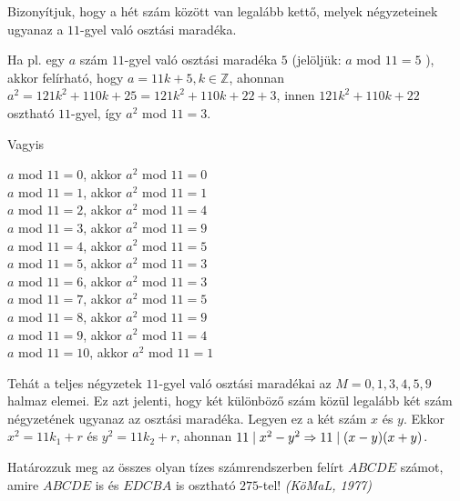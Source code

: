 \begin{solution}
	Bizonyítjuk, hogy a hét szám között van legalább kettő, melyek négyzeteinek
	ugyanaz a $11$-gyel való osztási maradéka.
	
	Ha pl. egy $a$ szám $11$-gyel való osztási maradéka $5$ (jelöljük:
	$a$ mod $11=5$ ), akkor felírható, hogy $a=11k+5,k\in\mathbb{Z}$,
	ahonnan $a^{2}=121k^{2}+110k+25=121k^{2}+110k+22+3$, innen $121k^{2}+110k+22$
	osztható $11$-gyel, így $a^{2}$ mod $11=3$.
	
	Vagyis 
	\begin{center}
		$a$ mod $11=0$, akkor $a^{2}$ mod $11=0$\\
		$a$ mod $11=1$, akkor $a^{2}$ mod $11=1$\\
		$a$ mod $11=2$, akkor $a^{2}$ mod $11=4$\\
		$a$ mod $11=3$, akkor $a^{2}$ mod $11=9$\\
		$a$ mod $11=4$, akkor $a^{2}$ mod $11=5$\\
		$a$ mod $11=5$, akkor $a^{2}$ mod $11=3$\\
		$a$ mod $11=6$, akkor $a^{2}$ mod $11=3$\\
		$a$ mod $11=7$, akkor $a^{2}$ mod $11=5$\\
		$a$ mod $11=8$, akkor $a^{2}$ mod $11=9$\\
		$a$ mod $11=9$, akkor $a^{2}$ mod $11=4$\\
		$a$ mod $11=10$, akkor $a^{2}$ mod $11=1$\\
		\par\end{center}
	Tehát a teljes négyzetek $11$-gyel való osztási maradékai az $M={0,1,3,4,5,9}$
	halmaz elemei. Ez azt jelenti, hogy két különböző szám közül legalább
	két szám négyzetének ugyanaz az osztási maradéka. Legyen ez a két
	szám $x$ és $y$. Ekkor $x^{2}=11k_{1}+r$ és $y^{2}=11k_{2}+r$,
	ahonnan $11\mid x^{2}-y^{2}\Rightarrow\newline11\mid(x-y)(x+y)$.
\end{solution}
\begin{extraproblem}
	Határozzuk meg az összes olyan tízes számrendszerben felírt $ABCDE$
	számot, amire $ABCDE$ is és $EDCBA$ is osztható $275$-tel! \emph{(KöMaL,
		1977) }
\end{extraproblem}

